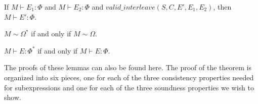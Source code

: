 \begin{lem}
\label{lemma:effsound:effects2}
If $M \vdash E_1 : \Phi$ and $M \vdash E_2 : \Phi$ and $valid\_interleave(S, C, E', E_1, E_2)$, then $M \vdash E' : \Phi$.
\end{lem}

\begin{lem}
\label{lemma:omegaclosure}
$M \sim \Omega^*$ if and only if $M \sim \Omega$.
\end{lem}

\begin{lem}
\label{lemma:phiclosure}
$M \vdash E : \Phi^*$ if and only if $M \vdash E : \Phi$.
\end{lem}

The proofs of these lemmas can also be found here\cite{LegionTypes12}.  The proof of the theorem is organized
into six pieces, one for each of the three consistency properties needed for subexpressions and one
for each of the three soundness properties we wish to show.


